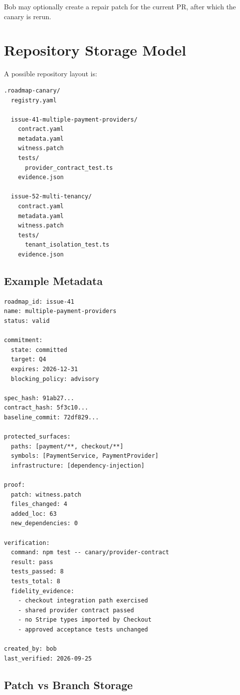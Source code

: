 \documentclass[12pt]{article}
\begin{document}
Bob may optionally create a repair patch for the current PR, after which the canary is rerun.

\section{Repository Storage Model}

A possible repository layout is:

\begin{lstlisting}
.roadmap-canary/
  registry.yaml

  issue-41-multiple-payment-providers/
    contract.yaml
    metadata.yaml
    witness.patch
    tests/
      provider_contract_test.ts
    evidence.json

  issue-52-multi-tenancy/
    contract.yaml
    metadata.yaml
    witness.patch
    tests/
      tenant_isolation_test.ts
    evidence.json
\end{lstlisting}

\subsection{Example Metadata}

\begin{lstlisting}
roadmap_id: issue-41
name: multiple-payment-providers
status: valid

commitment:
  state: committed
  target: Q4
  expires: 2026-12-31
  blocking_policy: advisory

spec_hash: 91ab27...
contract_hash: 5f3c10...
baseline_commit: 72df829...

protected_surfaces:
  paths: [payment/**, checkout/**]
  symbols: [PaymentService, PaymentProvider]
  infrastructure: [dependency-injection]

proof:
  patch: witness.patch
  files_changed: 4
  added_loc: 63
  new_dependencies: 0

verification:
  command: npm test -- canary/provider-contract
  result: pass
  tests_passed: 8
  tests_total: 8
  fidelity_evidence:
    - checkout integration path exercised
    - shared provider contract passed
    - no Stripe types imported by Checkout
    - approved acceptance tests unchanged

created_by: bob
last_verified: 2026-09-25
\end{lstlisting}

\subsection{Patch vs Branch Storage}
\end{document}
